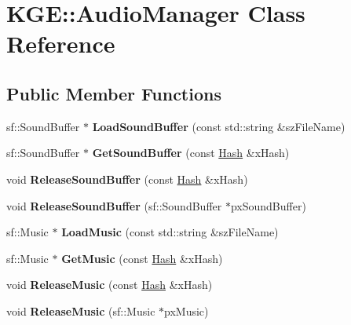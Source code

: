 \hypertarget{class_k_g_e_1_1_audio_manager}{\section{K\-G\-E\-:\-:Audio\-Manager Class Reference}
\label{class_k_g_e_1_1_audio_manager}
}
\subsection*{Public Member Functions}
\begin{DoxyCompactItemize}
\item 
\hypertarget{class_k_g_e_1_1_audio_manager_a6bf2dc211229a40466f0540914d346ce}{sf\-::\-Sound\-Buffer $\ast$ {\bfseries Load\-Sound\-Buffer} (const std\-::string \&sz\-File\-Name)}\label{class_k_g_e_1_1_audio_manager_a6bf2dc211229a40466f0540914d346ce}

\item 
\hypertarget{class_k_g_e_1_1_audio_manager_ac0c0d798d67b3b44e9426e852dcad6d6}{sf\-::\-Sound\-Buffer $\ast$ {\bfseries Get\-Sound\-Buffer} (const \hyperlink{class_k_g_e_1_1_hash}{Hash} \&x\-Hash)}\label{class_k_g_e_1_1_audio_manager_ac0c0d798d67b3b44e9426e852dcad6d6}

\item 
\hypertarget{class_k_g_e_1_1_audio_manager_ae3026354c1c161f6be0e9b0316d54fd0}{void {\bfseries Release\-Sound\-Buffer} (const \hyperlink{class_k_g_e_1_1_hash}{Hash} \&x\-Hash)}\label{class_k_g_e_1_1_audio_manager_ae3026354c1c161f6be0e9b0316d54fd0}

\item 
\hypertarget{class_k_g_e_1_1_audio_manager_a1bb38460c179762402de6e5bd29878bc}{void {\bfseries Release\-Sound\-Buffer} (sf\-::\-Sound\-Buffer $\ast$px\-Sound\-Buffer)}\label{class_k_g_e_1_1_audio_manager_a1bb38460c179762402de6e5bd29878bc}

\item 
\hypertarget{class_k_g_e_1_1_audio_manager_abdd1f5cfc90ab01999ae4a4f3b96dc4c}{sf\-::\-Music $\ast$ {\bfseries Load\-Music} (const std\-::string \&sz\-File\-Name)}\label{class_k_g_e_1_1_audio_manager_abdd1f5cfc90ab01999ae4a4f3b96dc4c}

\item 
\hypertarget{class_k_g_e_1_1_audio_manager_a31cd2ed12aa70872ba01470e577f5f7c}{sf\-::\-Music $\ast$ {\bfseries Get\-Music} (const \hyperlink{class_k_g_e_1_1_hash}{Hash} \&x\-Hash)}\label{class_k_g_e_1_1_audio_manager_a31cd2ed12aa70872ba01470e577f5f7c}

\item 
\hypertarget{class_k_g_e_1_1_audio_manager_adf67d324fc7c9d71e35c6b7e2a1ef5db}{void {\bfseries Release\-Music} (const \hyperlink{class_k_g_e_1_1_hash}{Hash} \&x\-Hash)}\label{class_k_g_e_1_1_audio_manager_adf67d324fc7c9d71e35c6b7e2a1ef5db}

\item 
\hypertarget{class_k_g_e_1_1_audio_manager_a3702028b53e65c39eef6cdd5c2e00350}{void {\bfseries Release\-Music} (sf\-::\-Music $\ast$px\-Music)}\label{class_k_g_e_1_1_audio_manager_a3702028b53e65c39eef6cdd5c2e00350}

\end{DoxyCompactItemize}
